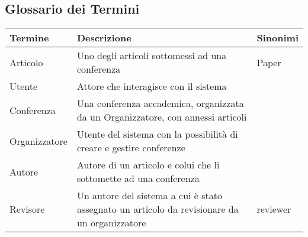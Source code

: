 \subsection{Glossario dei Termini}
\label{sec:glossario}
\begin{tabular}{|p{3cm}|p{6cm}|p{3cm}|}
  \hline
  \rowcolor{SkyBlue}
  Termine & Descrizione & Sinonimi \\
  \hline
  Articolo & Uno degli articoli sottomessi ad una conferenza & Paper \\
  \hline
  Utente & Attore che interagisce con il sistema & \\
  \hline
  Conferenza & Una conferenza accademica, organizzata da un Organizzatore, con annessi articoli & \\
  \hline
  Organizzatore & Utente del sistema con la possibilità di creare e gestire conferenze& \\
  \hline
  Autore & Autore di un articolo e colui che li sottomette ad una conferenza & \\
  \hline
  Revisore & Un autore del sistema a cui è stato assegnato un articolo da revisionare da un organizzatore & reviewer\\
  \hline
\end{tabular}

